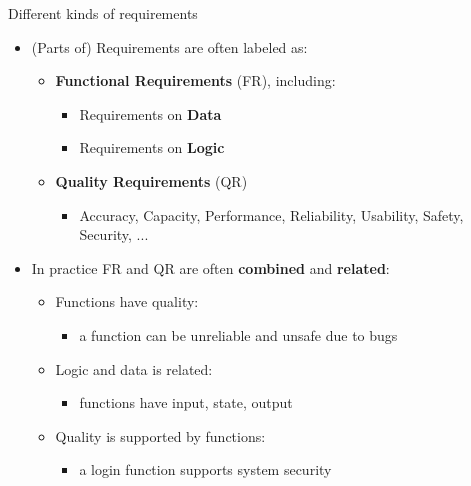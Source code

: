 \begin{Slide}{Different kinds of requirements}

\begin{itemize}
\item (Parts of) Requirements are often labeled as:
\begin{itemize}
\item \textbf{Functional Requirements} (FR), including:
\begin{itemize}
\item Requirements on \textbf{Data}
\item Requirements on \textbf{Logic}
\end{itemize}
\item \textbf{Quality Requirements} (QR)
\begin{itemize}
\item Accuracy, Capacity, Performance, Reliability, Usability, Safety, Security, ...
\end{itemize}
\end{itemize}
\item In practice FR and QR are often \textbf{combined} and \textbf{related}:
\begin{itemize}
\item Functions have quality:
\begin{itemize}
\item a function can be unreliable and unsafe due to bugs 
\end{itemize}
\item Logic and data is related: 
\begin{itemize}
\item functions have input, state, output
\end{itemize}
\item Quality is supported by functions: 
\begin{itemize}
\item a login function supports system security


\end{itemize}
\end{itemize}
\end{itemize}
\end{Slide}